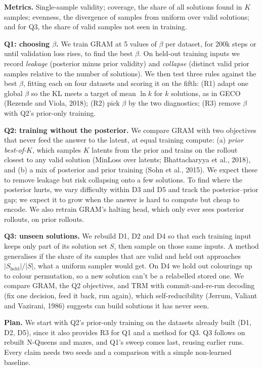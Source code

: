 \documentclass[10pt]{article}
\begin{document}
\textbf{Metrics.} Single-sample validity; coverage, the share of all solutions found in $K$ samples; evenness, the
divergence of samples from uniform over valid solutions; and for Q3, the share of valid samples not seen in training.

\textbf{Q1: choosing $\beta$.} We train GRAM at 5 values of $\beta$ per dataset, for 200k steps or until validation
loss rises, to find the best $\beta$. On held-out training inputs we record \emph{leakage} (posterior minus prior
validity) and \emph{collapse} (distinct valid prior samples relative to the number of solutions). We then test three
rules against the best $\beta$, fitting each on four datasets and scoring it on the fifth: (R1) adapt one global
$\beta$ so the KL meets a target of mean $\ln k$ for $k$ solutions, as in GECO (Rezende and Viola, 2018); (R2) pick
$\beta$ by the two diagnostics; (R3) remove $\beta$ with Q2's prior-only training.

\textbf{Q2: training without the posterior.} We compare GRAM with two objectives that never feed the answer to the
latent, at equal training compute: (a) \emph{prior best-of-$K$}, which samples $K$ latents from the prior and trains on
the rollout closest to any valid solution (MinLoss over latents; Bhattacharyya et al., 2018), and (b) a mix of
posterior and prior training (Sohn et al., 2015). We expect these to remove leakage but risk collapsing onto a few
solutions. To find where the posterior hurts, we vary difficulty within D3 and D5 and track the posterior--prior gap;
we expect it to grow when the answer is hard to compute but cheap to encode. We also retrain GRAM's halting head,
which only ever sees posterior rollouts, on prior rollouts.

\textbf{Q3: unseen solutions.} We rebuild D1, D2 and D4 so that each training input keeps only part of its solution
set $S$, then sample on those same inputs. A method generalises if the share of its samples that are valid and held
out approaches $|S_{\text{held}}|/|S|$, what a uniform sampler would get. On D4 we hold out colourings up to colour
permutation, so a new solution can't be a relabelled stored one. We compare GRAM, the Q2 objectives, and TRM with
commit-and-re-run decoding (fix one decision, feed it back, run again), which self-reducibility (Jerrum, Valiant and
Vazirani, 1986) suggests can build solutions it has never seen.

\textbf{Plan.} We start with Q2's prior-only training on the datasets already built (D1, D2, D5), since it also
provides R3 for Q1 and a method for Q3. Q3 follows on rebuilt N-Queens and mazes, and Q1's sweep comes last, reusing
earlier runs. Every claim needs two seeds and a comparison with a simple non-learned baseline.
\end{document}
